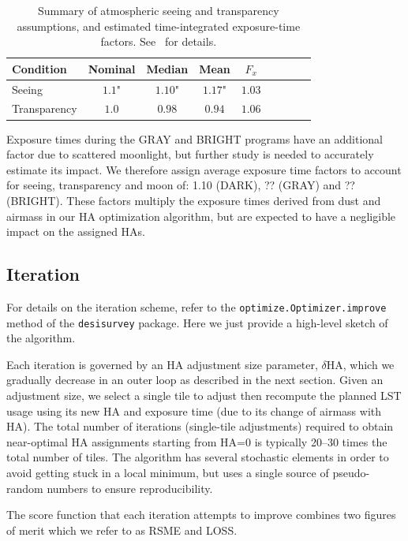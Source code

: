 \documentclass[12pt]{article}
\begin{document}
\begin{table}[htb]
\begin{center}
\begin{tabular}{lcccccccc}
Condition & Nominal & Median & Mean & $F_x$ \\
\hline
      Seeing & $1.1$" & $1.10$" & $1.17$" & $1.03$ \\
Transparency & $1.0$  & $0.98$  & $0.94$  & $1.06$ \\
\hline
\end{tabular}
\caption{Summary of atmospheric seeing and transparency assumptions, and estimated time-integrated exposure-time factors. See~\cite{desi-3087} for details.}
\label{tab:expfac}
\end{center}
\end{table}

Exposure times during the GRAY and BRIGHT programs have an additional factor due to scattered moonlight, but further study is needed to accurately estimate its impact.  We therefore assign average exposure time factors to account for seeing, transparency and moon of: 1.10 (DARK), ?? (GRAY) and ?? (BRIGHT). These factors multiply the exposure times derived from dust and airmass in our HA optimization algorithm, but are expected to have a negligible impact on the assigned HAs.

\subsection{Iteration}

For details on the iteration scheme, refer to the {\tt optimize.Optimizer.improve} method of the {\tt desisurvey} package. Here we just provide a high-level sketch of the algorithm.

Each iteration is governed by an HA adjustment size parameter, $\delta\text{HA}$, which we gradually decrease in an outer loop as described in the next section. Given an adjustment size, we select a single tile to adjust then recompute the planned LST usage using its new HA and exposure time (due to its change of airmass with HA). The total number of iterations (single-tile adjustments) required to obtain near-optimal HA assignments starting from HA=0 is typically 20--30 times the total number of tiles. The algorithm has several stochastic elements in order to avoid getting stuck in a local minimum, but uses a single source of pseudo-random numbers to ensure reproducibility.

The score function that each iteration attempts to improve combines two figures of merit which we refer to as RSME and LOSS.
\end{document}
